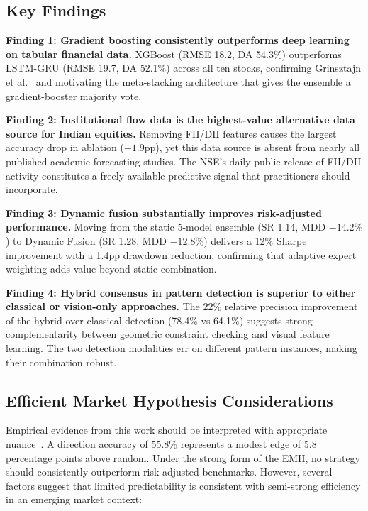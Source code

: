 \documentclass[10pt,a4paper,twoside]{article}
\begin{document}
\subsection{Key Findings}

\textbf{Finding 1: Gradient boosting consistently outperforms deep learning
on tabular financial data.} XGBoost (RMSE 18.2, DA 54.3\%) outperforms
LSTM-GRU (RMSE 19.7, DA 52.1\%) across all ten stocks, confirming
Grinsztajn et al.~\cite{grinsztajn2022} and motivating the meta-stacking
architecture that gives the ensemble a gradient-booster majority vote.

\textbf{Finding 2: Institutional flow data is the highest-value alternative
data source for Indian equities.} Removing FII/DII features causes the
largest accuracy drop in ablation ($-1.9$pp), yet this data source is absent
from nearly all published academic forecasting studies. The NSE's daily
public release of FII/DII activity constitutes a freely available predictive
signal that practitioners should incorporate.

\textbf{Finding 3: Dynamic fusion substantially improves risk-adjusted
performance.} Moving from the static 5-model ensemble (SR 1.14, MDD $-14.2\%$)
to Dynamic Fusion (SR 1.28, MDD $-12.8\%$) delivers a 12\% Sharpe improvement
with a 1.4pp drawdown reduction, confirming that adaptive expert weighting
adds value beyond static combination.

\textbf{Finding 4: Hybrid consensus in pattern detection is superior to either
classical or vision-only approaches.} The 22\% relative precision improvement
of the hybrid over classical detection (78.4\% vs 64.1\%) suggests strong
complementarity between geometric constraint checking and visual feature
learning. The two detection modalities err on different pattern instances,
making their combination robust.

\subsection{Efficient Market Hypothesis Considerations}

Empirical evidence from this work should be interpreted with appropriate
nuance~\cite{fama1970}. A direction accuracy of 55.8\% represents a modest
edge of 5.8 percentage points above random. Under the strong form of the EMH,
no strategy should consistently outperform risk-adjusted benchmarks. However,
several factors suggest that limited predictability is consistent with
semi-strong efficiency in an emerging market context:
\end{document}
